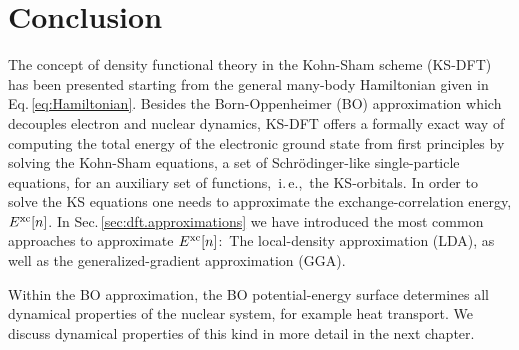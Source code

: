\section{Conclusion}
The concept of density functional theory in the Kohn-Sham scheme (KS-DFT) has been presented starting from the general many-body Hamiltonian given in Eq.\,\eqref{eq:Hamiltonian}. Besides the Born-Oppenheimer (BO) approximation which decouples electron and nuclear dynamics, KS-DFT offers a formally exact way of computing the total energy of the electronic ground state from first principles by solving the Kohn-Sham equations, a set of Schr\"odinger-like single-particle equations, for an auxiliary set of functions,~i.\,e.,~the KS-orbitals. In order to solve the KS equations one needs to approximate the exchange-correlation energy, $E^{\rm xc} [n]$. In Sec.\,\ref{sec:dft.approximations} we have introduced the most common approaches to approximate $E^{\rm xc} [n]$:~The local-density approximation (LDA), as well as the generalized-gradient approximation (GGA).

Within the BO approximation, the BO potential-energy surface determines all dynamical properties of the nuclear system, for example heat transport. We discuss dynamical properties of this kind in more detail in the next chapter.